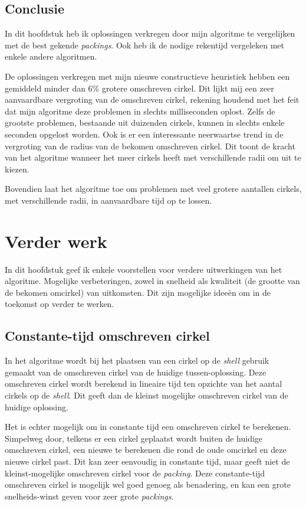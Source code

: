 \documentclass[12pt,a4paper,oneside]{book}
\begin{document}
\section{Conclusie}

In dit hoofdstuk heb ik oplossingen verkregen door mijn algoritme te vergelijken met de best gekende \textit{packings}.
Ook heb ik de nodige rekentijd vergeleken met enkele andere algoritmen.

De oplossingen verkregen met mijn nieuwe constructieve heuristiek hebben een gemiddeld minder dan 6\% grotere omschreven cirkel.
Dit lijkt mij een zeer aanvaardbare vergroting van de omschreven cirkel, rekening houdend met het feit dat mijn algoritme deze problemen in slechts milliseconden oplost.
Zelfs de grootste problemen, bestaande uit duizenden cirkels, kunnen in slechts enkele seconden opgelost worden.
Ook is er een interessante neerwaartse trend in de vergroting van de radius van de bekomen omschreven cirkel.
Dit toont de kracht van het algoritme wanneer het meer cirkels heeft met verschillende radii om uit te kiezen.

Bovendien laat het algoritme toe om problemen met veel grotere aantallen cirkels, met verschillende radii, in aanvaardbare tijd op te lossen.

\chapter{Verder werk} \label{chap:verder-werk}

In dit hoofdstuk geef ik enkele voorstellen voor verdere uitwerkingen van het algoritme.
Mogelijke verbeteringen, zowel in snelheid als kwaliteit (de grootte van de bekomen omcirkel) van uitkomsten.
Dit zijn mogelijke ideeën om in de toekomst op verder te werken.

\section{Constante-tijd omschreven cirkel}

In het algoritme wordt bij het plaatsen van een cirkel op de \textit{shell} gebruik gemaakt van de omschreven cirkel van de huidige tussen-oplossing.
Deze omschreven cirkel wordt berekend in lineaire tijd ten opzichte van het aantal cirkels op de \textit{shell}.
Dit geeft dan de kleinst mogelijke omschreven cirkel van de huidige oplossing.

Het is echter mogelijk om in constante tijd een omschreven cirkel te berekenen.
Simpelweg door, telkens er een cirkel geplaatst wordt buiten de huidige omschreven cirkel, een nieuwe te berekenen die rond de oude omcirkel en deze nieuwe cirkel past.
Dit kan zeer eenvoudig in constante tijd, maar geeft niet de kleinst-mogelijke omschreven cirkel voor de \textit{packing}.
Deze constante-tijd omschreven cirkel is mogelijk wel goed genoeg als benadering, en kan een grote snelheids-winst geven voor zeer grote \textit{packings}.
\end{document}
